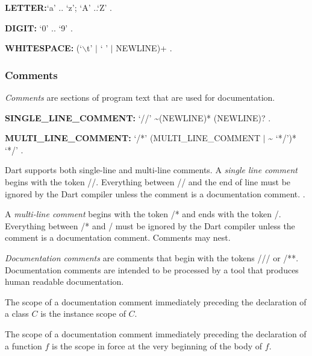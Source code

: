 \documentclass{article}
\newcommand{\code}[1]{{\sf #1}}
\begin{document}
\begin{itemize}

\begin{grammar}
 {\bf LETTER:}`a' {\escapegrammar ..} `z';
     `A' {\escapegrammar ..}`Z'
    .

{\bf DIGIT:}
      `0' {\escapegrammar ..} `9'
    .

{\bf WHITESPACE:}
      (`$\backslash$t' $|$ ` ' $|$ NEWLINE)+
    .
\end{grammar}

\subsubsection{Comments}

\LMHash{}
{\em Comments} are sections of program text that are used for documentation.

\begin{grammar}{\bf SINGLE\_LINE\_COMMENT:}
      `//' \~{}(NEWLINE)* (NEWLINE)?
    .

{\bf MULTI\_LINE\_COMMENT:}
      `/*' (MULTI\_LINE\_COMMENT $|$ \~{} `*/')* `*/'
    .
 \end{grammar}

\LMHash{}
Dart supports both single-line and multi-line comments. A {\em single line comment} begins with the token \code{//}. Everything between \code{//} and the end of line must be ignored by the Dart compiler unless the comment is a documentation comment. .

\LMHash{}
A {\em multi-line comment} begins with the token \code{/*} and ends with the token \code{*/}.  Everything between \code{/}* and \code{*}/ must be ignored by the Dart compiler unless the comment is a documentation comment. Comments may nest.

\LMHash{}
{\em Documentation comments} are comments that begin with the tokens  \code{///} or  \code{/**}. Documentation comments are intended to be processed by a tool that produces human readable documentation.


\LMHash{}
The scope of a documentation comment immediately preceding the declaration of a class $C$ is the instance scope of $C$.

\LMHash{}
The scope of a documentation comment immediately preceding the declaration of a function $f$  is the  scope in force at the very beginning of the body of $f$.






\end{itemize}
\end{document}
